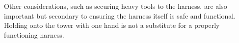 Other considerations, such as securing heavy tools to the harness, are also important but secondary to ensuring the harness itself is safe and functional. Holding onto the tower with one hand is not a substitute for a properly functioning harness.

